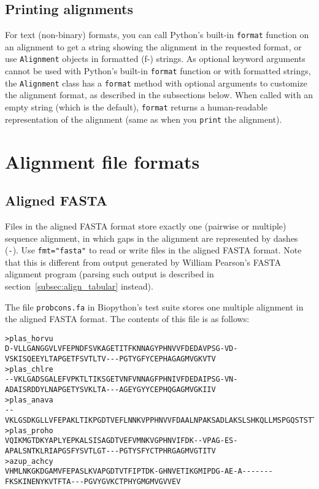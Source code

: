 \subsection{Printing alignments}
\label{subsec:align_printing}

For text (non-binary) formats, you can call Python's built-in \verb|format| function on an alignment to get a string showing the alignment in the requested format, or use \verb|Alignment| objects in formatted (f-) strings. As optional keyword arguments cannot be used with Python's built-in \verb|format| function or with formatted strings, the \verb|Alignment| class has a \verb|format| method with optional arguments to customize the alignment format, as described in the subsections below. When called with an empty string (which is the default), \verb|format| returns a human-readable representation of the alignment (same as when you \verb|print| the alignment).

\section{Alignment file formats}
\label{sec:alignformats}

\subsection{Aligned FASTA}
\label{subsec:align_fasta}

Files in the aligned FASTA format store exactly one (pairwise or multiple) sequence alignment, in which gaps in the alignment are represented by dashes (\verb|-|). Use \verb|fmt="fasta"| to read or write files in the aligned FASTA format. Note that this is different from output generated by William Pearson's FASTA alignment program (parsing such output is described in section~\ref{subsec:align_tabular} instead).

The file \verb+probcons.fa+ in Biopython's test suite stores one multiple alignment in the aligned FASTA format. The contents of this file is as follows:
\begin{verbatim}
>plas_horvu
D-VLLGANGGVLVFEPNDFSVKAGETITFKNNAGYPHNVVFDEDAVPSG-VD-VSKISQEEYLTAPGETFSVTLTV---PGTYGFYCEPHAGAGMVGKVTV
>plas_chlre
--VKLGADSGALEFVPKTLTIKSGETVNFVNNAGFPHNIVFDEDAIPSG-VN-ADAISRDDYLNAPGETYSVKLTA---AGEYGYYCEPHQGAGMVGKIIV
>plas_anava
--VKLGSDKGLLVFEPAKLTIKPGDTVEFLNNKVPPHNVVFDAALNPAKSADLAKSLSHKQLLMSPGQSTSTTFPADAPAGEYTFYCEPHRGAGMVGKITV
>plas_proho
VQIKMGTDKYAPLYEPKALSISAGDTVEFVMNKVGPHNVIFDK--VPAG-ES-APALSNTKLRIAPGSFYSVTLGT---PGTYSFYCTPHRGAGMVGTITV
>azup_achcy
VHMLNKGKDGAMVFEPASLKVAPGDTVTFIPTDK-GHNVETIKGMIPDG-AE-A-------FKSKINENYKVTFTA---PGVYGVKCTPHYGMGMVGVVEV
\end{verbatim}

